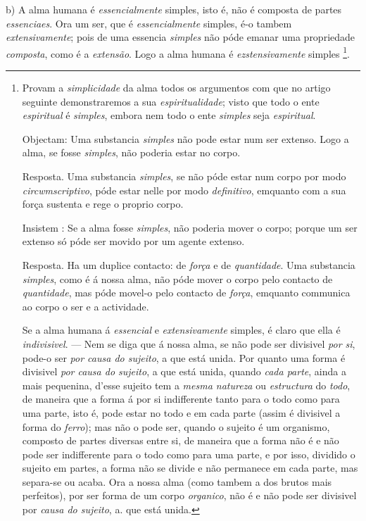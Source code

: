 b) A alma humana é \emph{essencialmente} simples, isto é, não é composta de partes \emph{essenciaes}. Ora um ser, que é \emph{essencialmente} simples, é-o tambem \emph{extensivamente}; pois de uma essencia \emph{simples} não póde emanar uma propriedade \emph{composta}, como é a \emph{extensão}. Logo a alma humana é \emph{ezstensivamente} simples \footnote{Provam a \emph{simplicidade} da alma todos os argumentos com que no artigo seguinte demonstraremos a sua \emph{espiritualidade}; visto que todo o ente \emph{espiritual} é \emph{simples}, embora nem todo o ente \emph{simples} seja \emph{espiritual}.\par Objectam: Uma substancia \emph{simples} não pode estar num ser extenso. Logo a alma, se fosse \emph{simples}, não poderia estar no corpo.\par Resposta. Uma substancia \emph{simples}, se não póde estar num corpo por modo \emph{circwmscriptivo}, póde estar nelle por modo \emph{definitivo}, emquanto com a sua força sustenta e rege o proprio corpo.\par Insistem : Se a alma fosse \emph{simples}, não poderia mover o corpo; porque um ser extenso só póde ser movido por um agente extenso.\par Resposta. Ha um duplice contacto: de \emph{força} e de \emph{quantidade}. Uma substancia \emph{simples}, como é á nossa alma, não póde mover o corpo pelo contacto de \emph{quantidade}, mas póde movel-o pelo contacto de \emph{força}, emquanto communica ao corpo o ser e a actividade.\par Se a alma humana á \emph{essencial} e \emph{extensivamente} simples, é claro que ella é \emph{indivisivel}. --- Nem se diga que á nossa alma, se não pode ser divisivel \emph{por si}, pode-o ser \emph{por causa do sujeito}, a que está unida. Por quanto uma forma é divisivel \emph{por causa do sujeito}, a que está unida, quando \emph{cada parte}, ainda a mais pequenina, d'esse sujeito tem a \emph{mesma natureza} ou \emph{estructura} do \emph{todo}, de maneira que a forma á por si indifferente tanto para o todo como para uma parte, isto é, pode estar no todo e em cada parte (assim é divisivel a forma do \emph{ferro}); mas não o pode ser, quando o sujeito é um organismo, composto de partes diversas entre si, de maneira que a forma não é e não pode ser indifferente para o todo como para uma parte, e por isso, dividido o sujeito em partes, a forma não se divide e não permanece em cada parte, mas separa-se ou acaba. Ora a nossa alma (como tambem a dos brutos mais perfeitos), por ser forma de um corpo \emph{organico}, não é e não pode ser divisivel por \emph{causa do sujeito}, a. que está unida.}.

